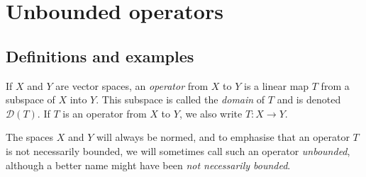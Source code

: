 \documentclass[article, a4paper, 11pt, oneside]{memoir}
\numberwithin{equation}{chapter}
\newcommand{\calH}{\mathcal{H}}
\newcommand{\calE}{\mathcal{E}}
\newcommand{\dom}{\mathcal{D}}
\newcommand{\range}{\mathcal{R}}
\newcommand{\nullspace}{\mathcal{N}}
\theoremstyle{myexample}
\theoremstyle{myexample}
\theoremstyle{myexamplebreak}
\theoremstyle{myexamplebreak}
\theoremstyle{nonumberplain}
\theoremstyle{MyNonumberplain}
\begin{document}






\chapter{Unbounded operators}

\section{Definitions and examples}

\begin{definition}
    If $X$ and $Y$ are vector spaces, an \emph{operator} from $X$ to $Y$ is a linear map $T$ from a subspace of $X$ into $Y$. This subspace is called the \emph{domain} of $T$ and is denoted $\dom(T)$. If $T$ is an operator from $X$ to $Y$, we also write $T\colon X \to Y$.
\end{definition}
%
The spaces $X$ and $Y$ will always be normed, and to emphasise that an operator $T$ is not necessarily bounded, we will sometimes call such an operator \emph{unbounded}, although a better name might have been \emph{not necessarily bounded}.
\end{document}
